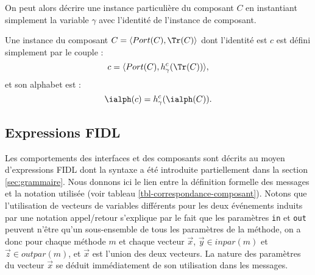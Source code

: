 On peut alors d\'ecrire une instance particuli\`ere du composant $C$
en instantiant simplement la variable $\gamma$ avec l'identit\'e de
l'instance de composant.

\begin{definition}
\label{def:instcomp}
 Une instance du composant  $C = \langle Port(C),\Tr(C) \rangle$ dont
 l'identit\'e est  $c$ est d\'efini simplement par le couple :
$$c = \langle Port(C),h_{\gamma}^{c}(\Tr(C)) \rangle,$$
et son alphabet est :
$$\ialph(c) = h_{\gamma}^{c}(\ialph(C)).$$
\end{definition}

\subsection{Expressions \textsf{FIDL}}

Les comportements des interfaces et des composants sont d\'ecrits au
moyen d'expressions \textsf{FIDL} dont la syntaxe a \'et\'e
introduite partiellement dans la section \ref{sec:grammaire}. Nous
donnons ici le lien entre la d\'efinition formelle des messages et la notation
utilis\'ee (voir tableau \ref{tbl-correspondance-composant}). Notons que l'utilisation de
vecteurs de variables diff\'erents pour les deux \'ev\'enements
induits par une notation appel/retour s'explique par le fait que les
param\`etres \texttt{in} et \texttt{out} peuvent n'\^etre qu'un
sous-ensemble de tous les param\`etres de la m\'ethode, on a donc
pour chaque m\'ethode $m$ et chaque vecteur $\vec{x}$, 
$\vec{y}\in inpar(m)$ et $\vec{z}\in outpar(m)$, et $\vec{x}$ est \og l'union\fg{} des deux
vecteurs. La nature des
param\`etres du vecteur $\vec{x}$ se d\'eduit imm\'ediatement de
son utilisation dans les messages.

